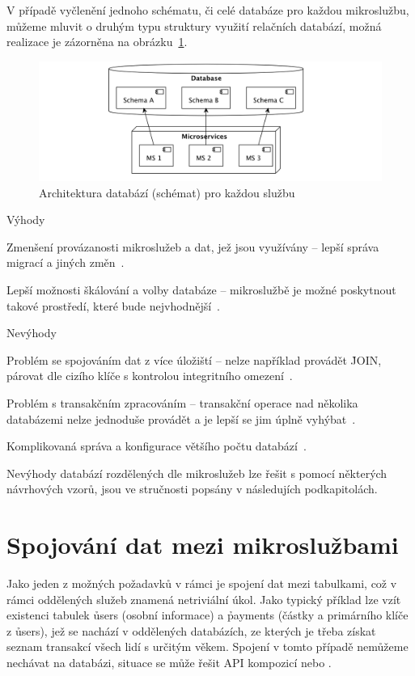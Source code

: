 V případě vyčlenění jednoho schématu, či celé databáze pro každou mikroslužbu, můžeme mluvit o druhým typu struktury využití relačních databází, možná realizace je zázorněna na obrázku~\ref{fig:db-per-micro}.

\begin{figure}[htbp]
   \centering
   \includegraphics[max width=\textwidth]{assets/db-per-micro}
   \caption{Architektura databází (schémat) pro každou službu}\label{fig:db-per-micro}
\end{figure}



Výhody
\begin{ul}
   \item Zmenšení provázanosti mikroslužeb a dat, jež jsou využívány – lepší správa migrací a jiných změn~\cite{dbperservice}.
   \item Lepší možnosti škálování a volby databáze – mikroslužbě je možné poskytnout takové prostředí, které bude nejvhodnější~\cite{dbperservice}.
\end{ul}

Nevýhody
\begin{ul}
   \item Problém se spojováním dat z více úložiští – nelze například provádět \h{JOIN}, párovat dle cizího klíče s kontrolou integritního omezení~\cite{dbperservice}.
   \item Problém s transakčním zpracováním – transakční operace nad několika databázemi nelze jednoduše provádět a je lepší se jim úplně vyhýbat~\cite{dbperservice}.
   \item Komplikovaná správa a konfigurace většího počtu databází~\cite{dbperservice}.
\end{ul}

Nevýhody databází rozdělených dle mikroslužeb lze řešit s pomocí některých návrhových vzorů, jsou ve stručnosti popsány v následujích podkapitolách.



\section{Spojování dat mezi mikroslužbami}\label{sec:msa-db-join}
Jako jeden z možných požadavků v rámci  je spojení dat mezi tabulkami, což v rámci oddělených služeb znamená netriviální úkol.
Jako typický příklad lze vzít existenci tabulek \h{users} (osobní informace) a \h{payments} (částky a primárního klíče z \h{users}), jež se nachází v oddělených databázích, ze kterých je třeba získat seznam transakcí všech lidí s určitým věkem.
Spojení v tomto případě nemůžeme nechávat na databázi, situace se může řešit API kompozicí nebo .



